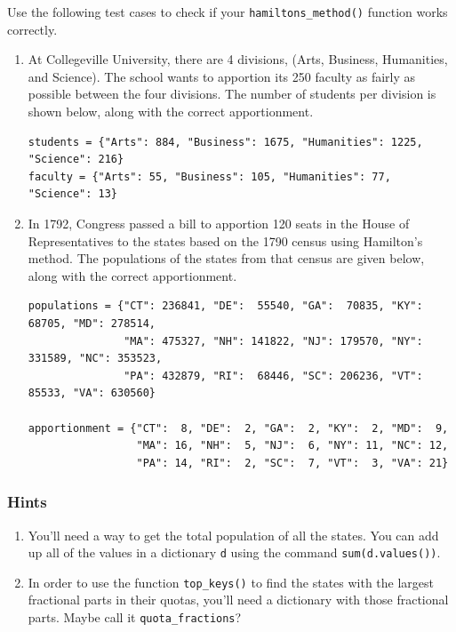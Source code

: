 \documentclass[11pt]{article}
\begin{document}
Use the following test cases to check if your \verb|hamiltons_method()| function works correctly.  
\begin{enumerate}
\item At Collegeville University, there are 4 divisions, (Arts, Business, Humanities, and Science). The school wants to apportion its 250 faculty as fairly as possible between the four divisions.  The number of students per division is shown below, along with the correct apportionment.
{\footnotesize
\begin{verbatim}
students = {"Arts": 884, "Business": 1675, "Humanities": 1225, "Science": 216}
faculty = {"Arts": 55, "Business": 105, "Humanities": 77, "Science": 13}
\end{verbatim}
}

\item In 1792, Congress passed a bill to apportion 120 seats in the House of Representatives to the states based on the 1790 census using Hamilton's method.  The populations of the states from that census are given below, along with the correct apportionment.  

{\footnotesize
\begin{verbatim}
populations = {"CT": 236841, "DE":  55540, "GA":  70835, "KY":  68705, "MD": 278514, 
               "MA": 475327, "NH": 141822, "NJ": 179570, "NY": 331589, "NC": 353523, 
               "PA": 432879, "RI":  68446, "SC": 206236, "VT":  85533, "VA": 630560}

apportionment = {"CT":  8, "DE":  2, "GA":  2, "KY":  2, "MD":  9, 
                 "MA": 16, "NH":  5, "NJ":  6, "NY": 11, "NC": 12, 
                 "PA": 14, "RI":  2, "SC":  7, "VT":  3, "VA": 21}
\end{verbatim}
}

\end{enumerate}

\subsubsection*{Hints}

\begin{enumerate}
\item You'll need a way to get the total population of all the states.  You can add up all of the values in a dictionary \verb|d| using the command \verb|sum(d.values())|.

\item In order to use the function \verb|top_keys()| to find the states with the largest fractional parts in their quotas, you'll need a dictionary with those fractional parts.  Maybe call it \verb|quota_fractions|?  %
\end{enumerate}
\end{document}

